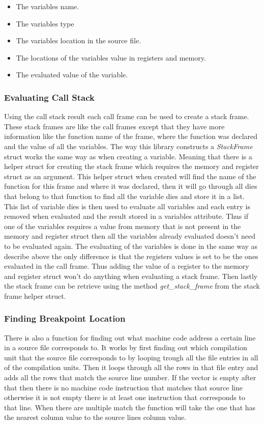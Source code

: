 \begin{itemize}
  \item The variables name.
  \item The variables type
  \item The variables location in the source file.
  \item The locations of the variables value in registers and memory.
  \item The evaluated value of the variable.
\end{itemize}


\subsubsection{Evaluating Call Stack}
Using the call stack result each call frame can be used to create a stack frame.
These stack frames are like the call frames except that they have more information like the function name of the frame, where the function was declared and the value of all the variables.
The way this library  constructs a \emph{StackFrame} struct works the same way as when creating a variable.
Meaning that there is a helper struct for creating the stack frame which requires the memory and register struct as an argument.
This helper struct when created will find the name of the function for this frame and where it was declared, then it will go through all dies that belong to that function to find all the variable dies and store it in a list.
This list of variable dies is then used to evaluate all variables and each entry is removed when evaluated and the result stored in a variables attribute.
Thus if one of the variables requires a value from memory that is not present in the memory and register struct then all the variables already evaluated doesn't need to be evaluated again.
The evaluating of the variables is done in the same way as describe above the only difference is that the registers values is set to be the ones evaluated in the call frame.
Thus adding the value of a register to the memory and register struct won't do anything when evaluating a stack frame.
Then lastly the stack frame can be retrieve using the method \emph{get\_stack\_frame} from the stack frame helper struct.


\subsubsection{Finding Breakpoint Location}
There is also a function for finding out what machine code address a certain line in a source file corresponds to.
It works by first finding out which compilation unit that the source file corresponds to by looping trough all the file entries in all of the compilation units. 
Then it loops through all the rows in that file entry and adds all the rows that match the source line number.
If the vector is empty after that then there is no machine code instruction that matches that source line otherwise it is not empty there is at least one instruction that corresponds to that line.
When there are multiple match the function will take the one that has the nearest column value to the source lines column value.

